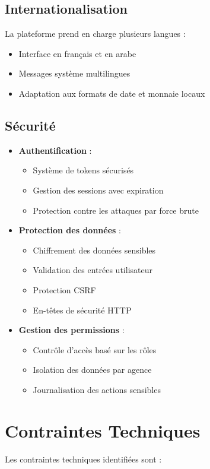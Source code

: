\subsection{Internationalisation}
La plateforme prend en charge plusieurs langues :
\begin{itemize}
    \item Interface en français et en arabe
    \item Messages système multilingues
    \item Adaptation aux formats de date et monnaie locaux
\end{itemize}

\subsection{Sécurité}
\begin{itemize}
    \item \textbf{Authentification} :
    \begin{itemize}
        \item Système de tokens sécurisés
        \item Gestion des sessions avec expiration
        \item Protection contre les attaques par force brute
    \end{itemize}
    
    \item \textbf{Protection des données} :
    \begin{itemize}
        \item Chiffrement des données sensibles
        \item Validation des entrées utilisateur
        \item Protection CSRF
        \item En-têtes de sécurité HTTP
    \end{itemize}
    
    \item \textbf{Gestion des permissions} :
    \begin{itemize}
        \item Contrôle d'accès basé sur les rôles
        \item Isolation des données par agence
        \item Journalisation des actions sensibles
    \end{itemize}
\end{itemize}

\section{Contraintes Techniques}
Les contraintes techniques identifiées sont :

